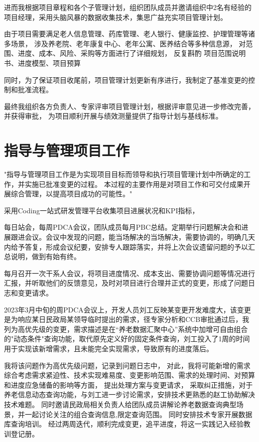 \documentclass[UTF8]{../computerUniverse}
\begin{document}
进而我根据项目章程和各个子管理计划，组织团队成员并邀请组织中2名有经验的项目经理，采用头脑风暴的数据收集技术，集思广益$充实$项目管理计划。

由于项目需要满足老人信息管理、药库管理、老人银行、健康监控、护理管理等诸多场景，
涉及养老院、老年康复中心、老年公寓、医养结合等多种信息源，
对范围、进度、成本、风险、采购等方面进行了详细规划，
反复斟酌 
项目范围说明书、进度模型、项目预算

同时，为了保证项目收尾前，项目管理计划$更新$有序进行，我制定了基准变更的控制和批准流程。

最终我组织各方负责人、专家$评审$项目管理计划，根据评审意见进一步修改完善，并获得审批，
为项目顺利开展与绩效测量提供了指导计划与基线标准。%





\section{指导与管理项目工作}
"指导与管理项目工作是为实现项目目标而领导和执行项目管理计划中所确定的工作，并实施已批准变更的过程。
本过程的主要作用是对项目工作和可交付成果开展综合管理，以提高项目成功的可能性。"


采用Coding一站式研发管理平台收集项目进展状况和KPI指标，

每日站会，每周PDCA会议，团队成员每月PBC总结。定期举行问题解决会和进展跟进会议。会议中发现的问题，能当场解决的当场解决，需要协调的，明确几天内给予答复，形成会议纪要，安排专人跟踪落实，并将上次会议遗留问题的予以汇总说明，做到有始有终。

每月召开一次干系人会议，将项目进度情况、成本支出、需要协调问题等情况进行汇报，并听取他们的反馈意见，及时对项目进行合理并正式的变更，形成了问题日志和变更请求。

2023年3月中旬的周PDCA会议上，开发人员刘工反映某变更开发难度大，该变更是为响应某日民政局某领导临时提出的需求，径专家分析和CCB审批通过后，我列为高优先级的变更，需求描述是在“养老数据汇聚中心”系统中加增可自由组合的"动态条件"查询功能，取代原先定义好的固定条件查询，刘工投入了1周的时间用于实现该新增需求，且未能完全实现需求，导致原有的进度落后。

我将该问题作为高优先级问题，记录到问题日志中，
对此，我将可能新增的需求综合考虑需求紧迫性、技术实现难易度、变更影响范围、需求的处理时间、对预算和进度应急储备的影响等方面，
提出处理方案与变更请求，
采取纠正措施，对于养老信息动态查询功能，与刘工进一步讨论需求，安排技术更熟悉的赵工协助解决技术难题。
同时邀请民政局相关负责人给团队成员讲解论养老数据查询典型场景，并一起讨论关注的组合查询信息,限定查询范围。
同时安排技术专家开展数据库查询培训。
经过两周迭代，顺利完成变更，追平进度，将这一实践记入经验教训登记册。
\end{document}
